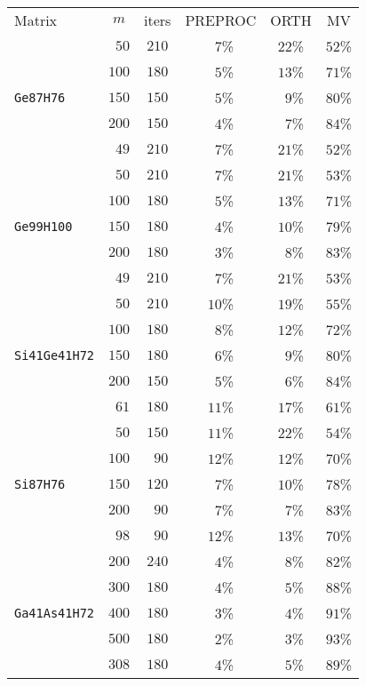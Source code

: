 \begin{tabular}{l|c|c|c|c|c}
\hline
\multirow{2}{*}{Matrix} & \multirow{2}{*}{$m$} & \multirow{2}{*}{iters} & \multirow{2}{*}{PREPROC} & \multirow{2}{*}{ORTH} & \multirow{2}{*}{MV} \\
 & & & & & \\\hline
\hline
  & $\phantom{0}50$ & $210$ & $\phantom{0}7$\% & $22$\% & $52$\%\\
  & $100$ & $180$ & $\phantom{0}5$\% & $13$\% & $71$\%\\
\verb|Ge87H76| & $150$ & $150$ & $\phantom{0}5$\% & $\phantom{0}9$\% & $80$\%\\
  & $200$ & $150$ & $\phantom{0}4$\% & $\phantom{0}7$\% & $84$\%\\
  & $\phantom{0}49$ & $210$ & $\phantom{0}7$\% & $21$\% & $52$\%\\\hline
  & $\phantom{0}50$ & $210$ & $\phantom{0}7$\% & $21$\% & $53$\%\\
  & $100$ & $180$ & $\phantom{0}5$\% & $13$\% & $71$\%\\
\verb|Ge99H100| & $150$ & $180$ & $\phantom{0}4$\% & $10$\% & $79$\%\\
  & $200$ & $180$ & $\phantom{0}3$\% & $\phantom{0}8$\% & $83$\%\\
  & $\phantom{0}49$ & $210$ & $\phantom{0}7$\% & $21$\% & $53$\%\\\hline
  & $\phantom{0}50$ & $210$ & $10$\% & $19$\% & $55$\%\\
  & $100$ & $180$ & $\phantom{0}8$\% & $12$\% & $72$\%\\
\verb|Si41Ge41H72| & $150$ & $180$ & $\phantom{0}6$\% & $\phantom{0}9$\% & $80$\%\\
  & $200$ & $150$ & $\phantom{0}5$\% & $\phantom{0}6$\% & $84$\%\\
  & $\phantom{0}61$ & $180$ & $11$\% & $17$\% & $61$\%\\\hline
  & $\phantom{0}50$ & $150$ & $11$\% & $22$\% & $54$\%\\
  & $100$ & $\phantom{0}90$ & $12$\% & $12$\% & $70$\%\\
\verb|Si87H76| & $150$ & $120$ & $\phantom{0}7$\% & $10$\% & $78$\%\\
  & $200$ & $\phantom{0}90$ & $\phantom{0}7$\% & $\phantom{0}7$\% & $83$\%\\
  & $\phantom{0}98$ & $\phantom{0}90$ & $12$\% & $13$\% & $70$\%\\\hline
  & $200$ & $240$ & $\phantom{0}4$\% & $\phantom{0}8$\% & $82$\%\\
  & $300$ & $180$ & $\phantom{0}4$\% & $\phantom{0}5$\% & $88$\%\\
\verb|Ga41As41H72| & $400$ & $180$ & $\phantom{0}3$\% & $\phantom{0}4$\% & $91$\%\\
  & $500$ & $180$ & $\phantom{0}2$\% & $\phantom{0}3$\% & $93$\%\\
  & $308$ & $180$ & $\phantom{0}4$\% & $\phantom{0}5$\% & $89$\%\\\hline
\end{tabular}